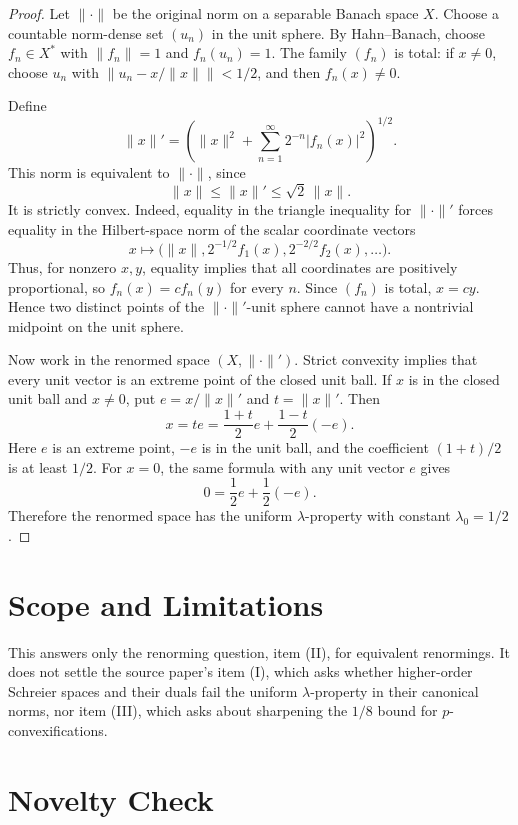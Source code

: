 \documentclass[11pt]{article}
\begin{document}
\begin{proof}
Let $\|\cdot\|$ be the original norm on a separable Banach space $X$. Choose a countable norm-dense set $(u_n)$ in the unit sphere. By Hahn--Banach, choose $f_n\in X^*$ with $\|f_n\|=1$ and $f_n(u_n)=1$. The family $(f_n)$ is total: if $x\ne 0$, choose $u_n$ with $\|u_n-x/\|x\|\|<1/2$, and then $f_n(x)\ne 0$.

Define
\[
  \|x\|'=\left(\|x\|^2+\sum_{n=1}^{\infty}2^{-n}|f_n(x)|^2\right)^{1/2}.
\]
This norm is equivalent to $\|\cdot\|$, since
\[
  \|x\|\leq \|x\|'\leq \sqrt{2}\,\|x\|.
\]
It is strictly convex. Indeed, equality in the triangle inequality for $\|\cdot\|'$ forces equality in the Hilbert-space norm of the scalar coordinate vectors
\[
  x\mapsto \bigl(\|x\|,2^{-1/2}f_1(x),2^{-2/2}f_2(x),\ldots\bigr).
\]
Thus, for nonzero $x,y$, equality implies that all coordinates are positively proportional, so $f_n(x)=c f_n(y)$ for every $n$. Since $(f_n)$ is total, $x=cy$. Hence two distinct points of the $\|\cdot\|'$-unit sphere cannot have a nontrivial midpoint on the unit sphere.

Now work in the renormed space $(X,\|\cdot\|')$. Strict convexity implies that every unit vector is an extreme point of the closed unit ball. If $x$ is in the closed unit ball and $x\ne 0$, put $e=x/\|x\|'$ and $t=\|x\|'$. Then
\[
  x=t e=\frac{1+t}{2}e+\frac{1-t}{2}(-e).
\]
Here $e$ is an extreme point, $-e$ is in the unit ball, and the coefficient $(1+t)/2$ is at least $1/2$. For $x=0$, the same formula with any unit vector $e$ gives
\[
  0=\frac12 e+\frac12(-e).
\]
Therefore the renormed space has the uniform $\lambda$-property with constant $\lambda_0=1/2$.
\end{proof}

\section*{Scope and Limitations}

This answers only the renorming question, item (II), for equivalent renormings. It does not settle the source paper's item (I), which asks whether higher-order Schreier spaces and their duals fail the uniform $\lambda$-property in their canonical norms, nor item (III), which asks about sharpening the $1/8$ bound for $p$-convexifications.

\section*{Novelty Check}
\end{document}

